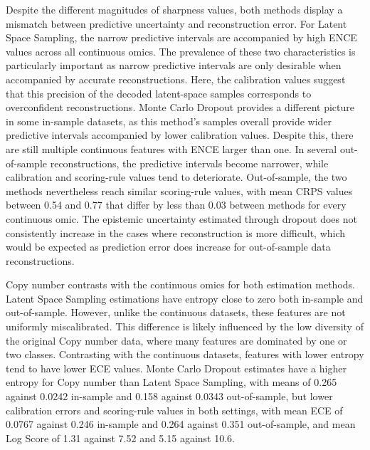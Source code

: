 Despite the different magnitudes of sharpness values, both methods display a mismatch between predictive uncertainty and reconstruction error. For Latent Space Sampling, the narrow predictive intervals are accompanied by high ENCE values across all continuous omics. The prevalence of these two characteristics is particularly important as narrow predictive intervals are only desirable when accompanied by accurate reconstructions. Here, the calibration values suggest that this precision of the decoded latent-space samples corresponds to overconfident reconstructions. Monte Carlo Dropout provides a different picture in some in-sample datasets, as this method's samples overall provide wider predictive intervals accompanied by lower calibration values. Despite this, there are still multiple continuous features with ENCE larger than one. In several out-of-sample reconstructions, the predictive intervals become narrower, while calibration and scoring-rule values tend to deteriorate. Out-of-sample, the two methods nevertheless reach similar scoring-rule values, with mean CRPS values between 0.54 and 0.77 that differ by less than 0.03 between methods for every continuous omic. The epistemic uncertainty estimated through dropout does not consistently increase in the cases where reconstruction is more difficult, which would be expected as prediction error does increase for out-of-sample data reconstructions.

Copy number contrasts with the continuous omics for both estimation methods. Latent Space Sampling estimations have entropy close to zero both in-sample and out-of-sample. However, unlike the continuous datasets, these features are not uniformly miscalibrated. This difference is likely influenced by the low diversity of the original Copy number data, where many features are dominated by one or two classes. Contrasting with the continuous datasets, features with lower entropy tend to have lower ECE values. Monte Carlo Dropout estimates have a higher entropy for Copy number than Latent Space Sampling, with means of 0.265 against 0.0242 in-sample and 0.158 against 0.0343 out-of-sample, but lower calibration errors and scoring-rule values in both settings, with mean ECE of 0.0767 against 0.246 in-sample and 0.264 against 0.351 out-of-sample, and mean Log Score of 1.31 against 7.52 and 5.15 against 10.6. 

